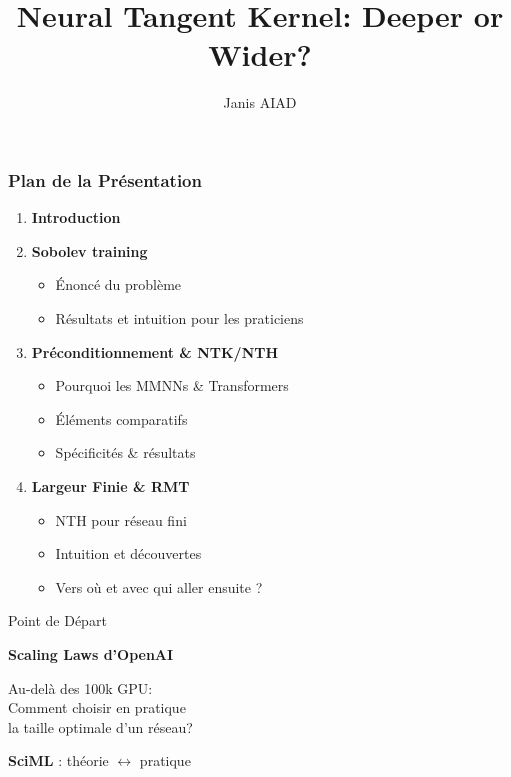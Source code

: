 \documentclass{beamer}
\title{Neural Tangent Kernel: Deeper or Wider?}
\author{Janis AIAD}
\institute{École Polytechnique \& University of Maryland}
\date{}
\begin{document}
\begin{frame}
\frametitle{Plan de la Présentation}

\begin{enumerate}
    \item \textbf{Introduction}
    \item \textbf{Sobolev training}
    \begin{itemize}
        \item Énoncé du problème
        \item Résultats et intuition pour les praticiens
    \end{itemize}
    
    \vspace{0.3cm}
    
    \item \textbf{Préconditionnement \& NTK/NTH}
    \begin{itemize}
        \item Pourquoi les MMNNs \& Transformers
        \item Éléments comparatifs
        \item Spécificités \& résultats        
    \end{itemize}
    
    \vspace{0.3cm}
    
    \item \textbf{Largeur Finie \& RMT}
    \begin{itemize}
        \item NTH pour réseau fini
        \item Intuition et découvertes
        \item Vers où et avec qui aller ensuite ?
    \end{itemize}
\end{enumerate}

\end{frame}



\begin{frame}
\titlepage
\end{frame}

\begin{frame}{Point de Départ}
\begin{center}
\textbf{Scaling Laws d'OpenAI}

\vspace{1cm}

Au-delà des 100k GPU:\\
Comment choisir en pratique\\
la taille optimale d'un réseau?

\vspace{0.5cm}

\textbf{SciML} : théorie $\leftrightarrow$ pratique
\end{center}
\end{frame}
\end{document}
